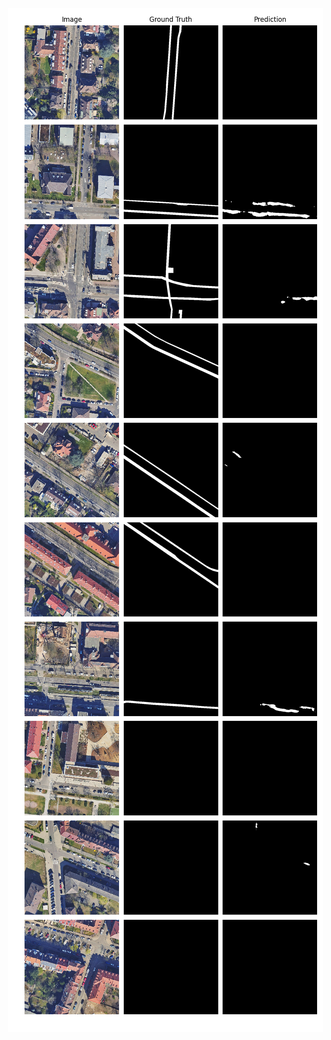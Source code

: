 	\begin{figure}
	\centering
	\begin{subfigure}{.4\textwidth}
		\centering
		\includegraphics[width=1.\textwidth]{Bilder/Samples-KA/vbunet-l.png} 

\end{subfigure}
\end{figure}
